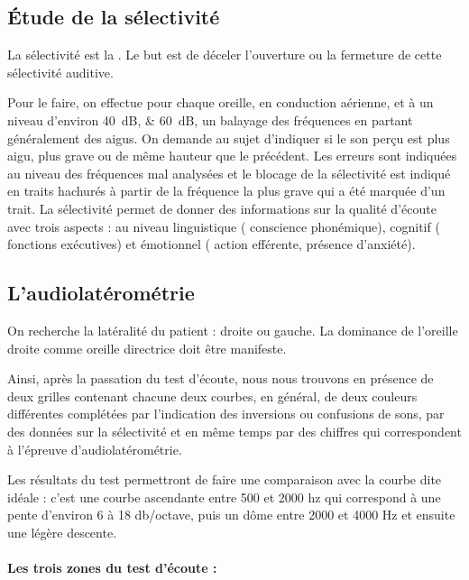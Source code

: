{\subsection{\'Etude de la sélectivité}

La sélectivité est la \autocite{tomatis:loreille}.
Le but est de déceler l'ouverture ou la fermeture de cette sélectivité
auditive. 

Pour le faire, on effectue pour chaque oreille, en conduction
aérienne, et à un niveau d'environ \SIlist{40;60}{\dB}, un balayage des
fréquences en partant généralement des aigus. On demande au sujet
d'indiquer si le son perçu est plus aigu, plus grave ou de même hauteur
que le précédent. Les erreurs sont indiquées au niveau des fréquences
mal analysées et le blocage de la sélectivité est indiqué en traits
hachurés à partir de la fréquence la plus grave qui a été marquée
d'un trait. La sélectivité permet de donner des informations sur la
qualité d'écoute avec trois aspects : au niveau linguistique ( conscience
phonémique), cognitif ( fonctions exécutives) et émotionnel ( action
efférente, présence d'anxiété).

\subsection{L'audiolatérométrie}

On recherche la latéralité du patient : droite ou gauche. La dominance
de l'oreille droite comme oreille directrice doit être manifeste.

Ainsi, après la passation du test d\textquoteright écoute, nous nous
trouvons en présence de deux grilles contenant chacune deux courbes,
en général, de deux couleurs différentes complétées par l'indication
des inversions ou confusions de sons, par des données sur la sélectivité
et en même temps par des chiffres qui correspondent à l'épreuve d'audiolatérométrie.

Les résultats du test permettront de faire une comparaison avec la
courbe dite idéale : c'est une courbe ascendante entre 500 et 2000
hz qui correspond à une pente d\textquoteright environ 6 à 18 db/octave,
puis un dôme entre 2000 et 4000 Hz et ensuite une légère descente. 

\paragraph{Les trois zones du test d'écoute : }

}
